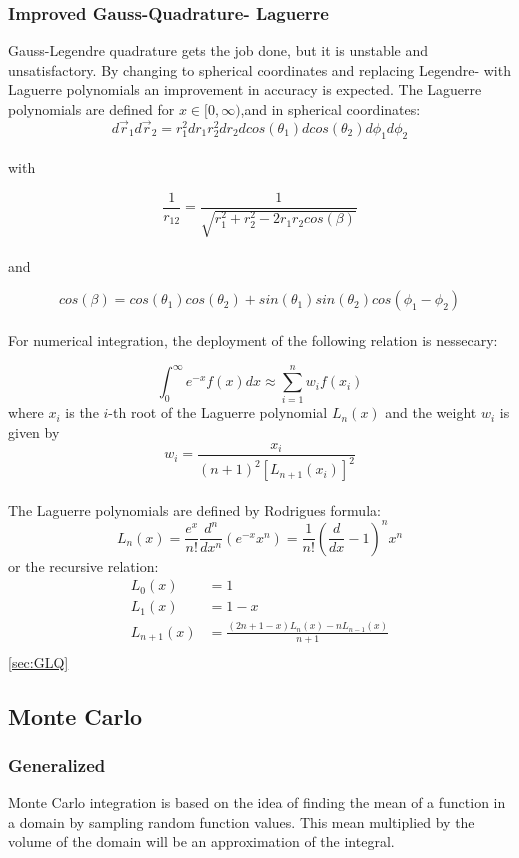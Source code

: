 \documentclass[../main.tex]{subfiles}
\begin{document}
\subsubsection{Improved Gauss-Quadrature- Laguerre} \label{sec:improved_GQ}
Gauss-Legendre quadrature gets the job done, but it is unstable and unsatisfactory. By changing to spherical coordinates and  replacing Legendre- with Laguerre polynomials an improvement in accuracy is expected. The Laguerre polynomials are defined for  $x \in [0, \infty)$,and in spherical coordinates:
\\

\[ d\vec{r}_1 d\vec{r}_2 = r_1^2 dr_1 r_2^2 dr_2 dcos(\theta_1) dcos(\theta_2) d\phi_1 d\phi_2\]
\\
with

\[\frac{1}{r_{12}} = \frac{1}{\sqrt{r_1^2 + r_2^2 - 2r_1r_2cos(\beta)}} \]
\\and


\[cos(\beta) = cos(\theta_1)cos(\theta_2) + sin(\theta_1)sin(\theta_2)cos(\phi_1 - \phi_2)\]
\\

For numerical integration, the deployment of the following relation is nessecary:

\[\int_0^\infty e^{-x}f(x)dx \approx \sum_{i=1}^n w_i f(x_i)\]
where $x_i$ is the $i$-th root of the Laguerre polynomial $L_n(x)$ and the weight $w_i$ is given by
\\
\[w_i = \frac{x_i}{(n+1)^2 [L_{n+1}(x_i)]^2}\]
\\
The Laguerre polynomials are defined by Rodrigues formula:
\[L_n(x) = \frac{e^x}{n!}\frac{d^n}{dx^n}\left(e^{-x} x^n\right) = \frac{1}{n!}\left(\frac{d}{dx}-1\right)^n x^n\]
or the recursive relation:
\begin{align*}
  L_0(x) &= 1\\
  L_1(x) &= 1 - x\\
  L_{n+1}(x) &= \frac{(2n + 1 - x)L_n(x) - nL_{n-1}(x)}{n+1}\\
\end{align*}
\ref{sec:GLQ}


\subsection{Monte Carlo}
\subsubsection{Generalized}
\label{sec:MC}
Monte Carlo integration is based on the idea of finding the mean of a function in a domain by sampling random function values. This mean multiplied by the volume of the domain will be an approximation of the integral. \\
\end{document}
